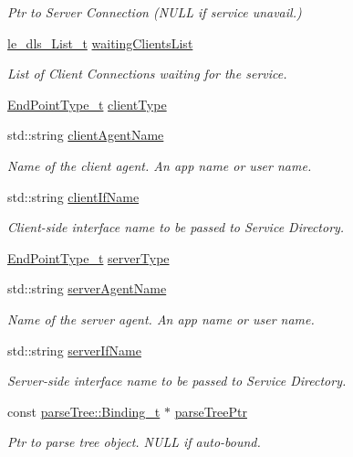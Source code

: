 \begin{DoxyCompactItemize}
\begin{DoxyCompactList}\small\item\em Ptr to Server Connection (N\+U\+LL if service unavail.) \end{DoxyCompactList}\item 
\hyperlink{structle__dls___list__t}{le\+\_\+dls\+\_\+\+List\+\_\+t} \hyperlink{struct_binding__t_a8b0a69ba3203735a21df1476f8d9f32d}{waiting\+Clients\+List}
\begin{DoxyCompactList}\small\item\em List of Client Connections waiting for the service. \end{DoxyCompactList}\item 
\hyperlink{struct_binding__t_a03d855e6b3e39d0542d365c9fa9884e7}{End\+Point\+Type\+\_\+t} \hyperlink{struct_binding__t_a38243dcb82462583640d972811c855c0}{client\+Type}
\item 
std\+::string \hyperlink{struct_binding__t_a4f25ffb956c425fec566793ec7c821ee}{client\+Agent\+Name}
\begin{DoxyCompactList}\small\item\em Name of the client agent. An app name or user name. \end{DoxyCompactList}\item 
std\+::string \hyperlink{struct_binding__t_aa122bf826664a8a3e20023537b441645}{client\+If\+Name}
\begin{DoxyCompactList}\small\item\em Client-\/side interface name to be passed to Service Directory. \end{DoxyCompactList}\item 
\hyperlink{struct_binding__t_a03d855e6b3e39d0542d365c9fa9884e7}{End\+Point\+Type\+\_\+t} \hyperlink{struct_binding__t_aadeea2b8fbb7bf79900933d10e171d48}{server\+Type}
\item 
std\+::string \hyperlink{struct_binding__t_a43b48ebab9d27ace98004af0b6249a17}{server\+Agent\+Name}
\begin{DoxyCompactList}\small\item\em Name of the server agent. An app name or user name. \end{DoxyCompactList}\item 
std\+::string \hyperlink{struct_binding__t_a51bc1d69847c0f2f550a7c478af03c2d}{server\+If\+Name}
\begin{DoxyCompactList}\small\item\em Server-\/side interface name to be passed to Service Directory. \end{DoxyCompactList}\item 
const \hyperlink{structparse_tree_1_1_binding__t}{parse\+Tree\+::\+Binding\+\_\+t} $\ast$ \hyperlink{struct_binding__t_ac069eee4a0e09669e9f74c07fec8a8e8}{parse\+Tree\+Ptr}
\begin{DoxyCompactList}\small\item\em Ptr to parse tree object. N\+U\+LL if auto-\/bound. \end{DoxyCompactList}\end{DoxyCompactItemize}
